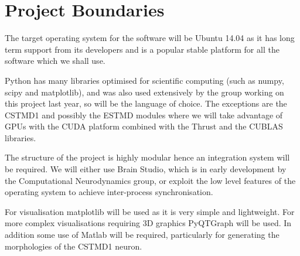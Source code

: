 \section{Project Boundaries}
\iffalse
\subsection{Stakeholders} \label{stakeholders}
\par The project has a strong academic motivation based on academic research currently being undertaken in the Neurodynamics community and within Prof. Murray Shanahan's group. The ultimate goal of the project is to publish a paper in collaboration with both PhD students Pedro Mediano and Zafeirios Fountas and thus make the project's findings available to the wider academic community.
\fi

\iffalse \subsection{Software and Hardware} \fi
The target operating system for the software will be Ubuntu 14.04 as it has long term support from its developers and is a popular stable platform for all the software which we shall use.

Python has many libraries optimised for scientific computing (such as numpy, scipy and matplotlib), and was also used extensively by the group working on this project last year, so will be the language of choice. The exceptions are the CSTMD1 and possibly the ESTMD modules where we will take advantage of GPUs with the CUDA platform combined with the Thrust and the CUBLAS libraries.

The structure of the project is highly modular hence an integration system will be required.  We will either use Brain Studio, which is in early development by the Computational Neurodynamics group, or exploit the low level features of the operating system to achieve inter-process synchronisation.

For visualisation matplotlib will be used as it is very simple and lightweight. For more complex visualisations requiring 3D graphics PyQTGraph will be used. In addition some use of Matlab will be required, particularly for generating the morphologies of the CSTMD1 neuron.

